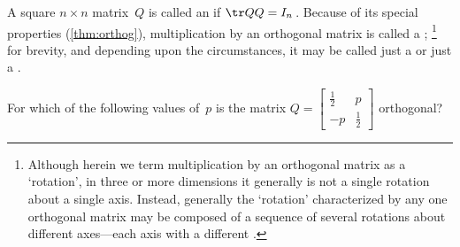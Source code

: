 \begin{definition} \label{def:orthog} 
A square \(n\times n\) matrix~\(Q\) is called an  if \(\tr QQ=I_n\)\,.
Because of its special properties (\cref{thm:orthog}),
multiplication by an orthogonal matrix is called a ;%
\footnote{Although herein we term multiplication by an orthogonal matrix as a `rotation', in three or more dimensions it generally is not a single rotation about a single axis.  
Instead, generally the `rotation' characterized by any one orthogonal matrix may be composed of a sequence of several rotations about different axes---each axis with a different .}
for brevity, and depending upon the circumstances, it may be called just a  or just a .
\end{definition}




\begin{activity}
For which of the following values of~\(p\) is the matrix \(Q=\begin{bmatrix} \frac12&p\\-p&\frac12 \end{bmatrix}\) orthogonal?
\end{activity}


